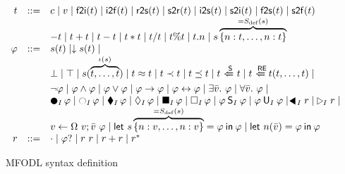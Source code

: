 \begin{figure}
	\[
		\begin{array}{r c l l}
			t    & :: = & c \mid v \mid \mfodlfti{t} \mid \mfodlitf{t} \mid \mfodlrts{t} \mid \mfodlstr{t} \mid \mathsf{i2s}(t) \mid \mathsf{s2i}(t) \mid \mathsf{f2s}(t) \mid \mathsf{s2f}(t)                                                                          \\
			     &      & -t \mid t + t \mid t - t \mid t * t \mid t / t \mid t \% t \mid
			t.n \mid s\overbrace{\{n:t,\ldots, n:t\}}^{= \mfodlSigSdefs(s)}                                                                                                                                                                                                                   \\
			\phi & ::=  & s(t)  \mid \mfodlclsymb{s}(t) \mid                                                                                                                                                                                                            \\
			     &      & \bot \mid \top \mid s(\overbrace{t,\ldots,t}^{\iota(s)}) \mid t \approx t \mid t \prec t \mid t \preceq t \mid t\ \mfodlsubs\ t \mid t\ \mfodlmatches\ t(t,\ldots,t) \mid                                                                     &                     \\
			     &      & \neg \phi \mid \phi \land \phi \mid  \phi \lor \phi \mid \phi \rightarrow \phi \mid \phi \leftrightarrow \phi \mid \exists\bar{v}.\ \phi \mid  \forall\bar{v}.\ \phi \mid                                                                     &                     \\
			     &      & \mfodlPrev_I \phi \mid \mfodlNext_I \phi \mid \mfodlOnce_I\phi \mid \mfodlEventually_I\phi \mid \mfodlPAlways_I\phi\mid \mfodlAlways_I\phi\mid\phi\mfodlSince_I \phi \mid \phi \mfodlUntil_I \phi \mid \matchMP{r}{I} \mid \matchMF{r}{I}\mid &                     \\
			     &      & v \leftarrow \Omega \ v; \bar{v} \ \phi\mid \mfodlLetin{s\overbrace{\{n:v,\ldots, n:v\}}^{= \mfodlSigSdefs(s)}}{\phi}{\phi}\mid \mfodlLetin{n(\bar{v})}{\phi}{\phi}                                                                           &                     \\
			r    & ::=  & \cdot \mid \phi? \mid r \ r \mid r + r \mid r^*                                                                                                                                                                                               
		\end{array}
	\]
	\caption{MFODL syntax definition}
	\label{fig:mfodl_syntax_def}
\end{figure}


